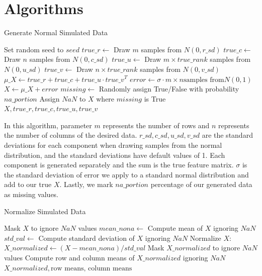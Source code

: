 \documentclass{article}
\begin{document}
\section{Algorithms} \label{appendix.b}
\begin{algorithm}[H]
\caption{Generate Normal Simulated Data}
\begin{algorithmic}[1]
    \State Set random seed to $seed$
    \State $true\_r \gets$ Draw $m$ samples from $N(0, r\_sd)$
    \State $true\_c \gets$ Draw $n$ samples from $N(0, c\_sd)$
    \State $true\_u \gets$ Draw $m \times true\_rank$ samples from $N(0, u\_sd)$
    \State $true\_v \gets$ Draw $n \times true\_rank$ samples from $N(0, v\_sd)$
    \State $\mu\_X \gets true\_r + true\_c + true\_u \cdot true\_v^T$
    \State $error \gets \sigma \cdot m \times n \text{samples from} N(0, 1)$
    \State $X \gets \mu\_X + error$
    \State $missing \gets$ Randomly assign True/False with probability $na\_portion$
    \State Assign $NaN$ to $X$ where $missing$ is True
    \State \Return $X, true\_r, true\_c, true\_u, true\_v$
\EndProcedure
\end{algorithmic}
\end{algorithm}
In this algorithm, parameter $m$ represents the number of rows and $n$ represents the number of columns of the desired data. $r\_sd, c\_sd, u\_sd, v\_sd$ are the standard deviations for each component when drawing samples from the normal distribution, and the standard deviations have default values of 1. Each component is generated separately and the sum is the true feature matrix. $\sigma$ is the standard deviation of error we apply to a standard normal distribution and add to our true $X$. Lastly, we mark $na\_portion$ percentage of our generated data as missing values.

\begin{algorithm}[H]
\caption{Normalize Simulated Data}
\begin{algorithmic}[1]
    \State Mask $X$ to ignore $NaN$ values
    \State $mean\_nona \gets$ Compute mean of $X$ ignoring $NaN$
    \State $std\_val \gets$ Compute standard deviation of $X$ ignoring $NaN$
    \State Normalize $X$: $X\_normalized \gets (X - mean\_nona) / std\_val$
    \State Mask $X\_normalized$ to ignore $NaN$ values
    \State Compute row and column means of $X\_normalized$ ignoring $NaN$
    \State \Return $X\_normalized, \text{row means, column means}$
\EndProcedure
\end{algorithmic}
\end{algorithm}
\end{document}

